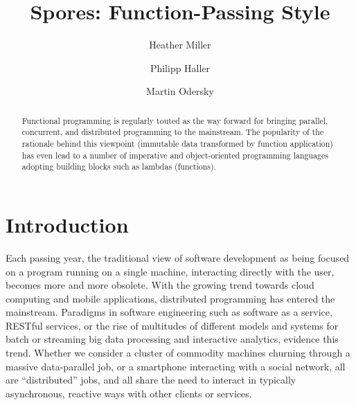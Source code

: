 \documentclass{llncs}
\begin{document}
%
\mainmatter              %
%
\title{Spores: Function-Passing Style}
%
%
\author{Heather Miller \and Philipp Haller
\and Martin Odersky}
%
%
%

\maketitle              %

\begin{abstract}

Functional programming is regularly touted as the way forward for bringing
parallel, concurrent, and distributed programming to the mainstream. The
popularity of the rationale behind this viewpoint (immutable data transformed
by function application) has even lead to a number of imperative and 
object-oriented programming languages adopting building blocks such as lambdas 
(functions). 

\end{abstract}
%
\section{Introduction}

Each passing year, the traditional view of software development as being
focused on a program running on a single machine, interacting directly with
the user, becomes more and more obsolete. With the growing trend towards cloud
computing and mobile applications, distributed programming has entered the
mainstream.
Paradigms in software engineering such as software as a service, RESTful
services, or the rise of multitudes of different models and systems for batch
or streaming big data processing and interactive analytics, evidence this trend.
Whether we consider a cluster of commodity machines churning through a massive
data-parallel job, or a smartphone interacting with a social network, all are
``distributed'' jobs, and all share the need to interact in typically
asynchronous, reactive ways with other clients or services. 
\end{document}

